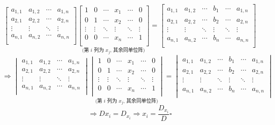 \documentclass[UTF8]{ctexart}
\DeclareMathOperator{\0}{\mathbf{0}}
\DeclareMathOperator{\<}{\langle}
\renewcommand{\>}{\rangle}
\begin{document}
\begin{prf}
			\[\begin{bmatrix}
				a_{1,1} & a_{1,2} & \cdots & a_{1,n}\\
				a_{2,1} & a_{2,2} & \cdots & a_{2,n}\\
				\vdots & \vdots & \ddots & \vdots\\
				a_{n,1} & a_{n,2} & \cdots & a_{n,n}\\
			\end{bmatrix}
			\underset{\text{(第 \(i\) 列为 \(x_j\), 其余同单位阵)}}{
			\begin{bmatrix}
				1 & 0 & \cdots & x_1 & \cdots & 0\\
				0 & 1 & \cdots & x_2 & \cdots & 0\\
				\vdots & \vdots & \ddots & \vdots & \ddots & \vdots\\
				0 & 0 & \cdots & x_n & \cdots & 1\\
			\end{bmatrix}}=
			\begin{bmatrix}
				a_{1,1} & a_{1,2} & \cdots & b_1 & \cdots & a_{1,n}\\
				a_{2,1} & a_{2,2} & \cdots & b_2 & \cdots & a_{2,n}\\
				\vdots & \vdots & \ddots & \vdots & \ddots & \vdots\\
				a_{n,1} & a_{n,2} & \cdots & b_n & \cdots & a_{n,n}\\
			\end{bmatrix}\]
			\[\Longrightarrow\begin{vmatrix}
				a_{1,1} & a_{1,2} & \cdots & a_{1,n}\\
				a_{2,1} & a_{2,2} & \cdots & a_{2,n}\\
				\vdots & \vdots & \ddots & \vdots\\
				a_{n,1} & a_{n,2} & \cdots & a_{n,n}\\
			\end{vmatrix}
			\underset{\text{(第 \(i\) 列为 \(x_j\), 其余同单位阵)}}{
			\begin{vmatrix}
				1 & 0 & \cdots & x_1 & \cdots & 0\\
				0 & 1 & \cdots & x_2 & \cdots & 0\\
				\vdots & \vdots & \ddots & \vdots & \ddots & \vdots\\
				0 & 0 & \cdots & x_n & \cdots & 1\\
			\end{vmatrix}}=
			\begin{vmatrix}
				a_{1,1} & a_{1,2} & \cdots & b_1 & \cdots & a_{1,n}\\
				a_{2,1} & a_{2,2} & \cdots & b_2 & \cdots & a_{2,n}\\
				\vdots & \vdots & \ddots & \vdots & \ddots & \vdots\\
				a_{n,1} & a_{n,2} & \cdots & b_n & \cdots & a_{n,n}\\
			\end{vmatrix}\]
			\[\Longrightarrow Dx_i=D_{x_i}\Longrightarrow x_i=\frac{D_{x_i}}{D}\square\]
    \end{prf}
\end{document}
